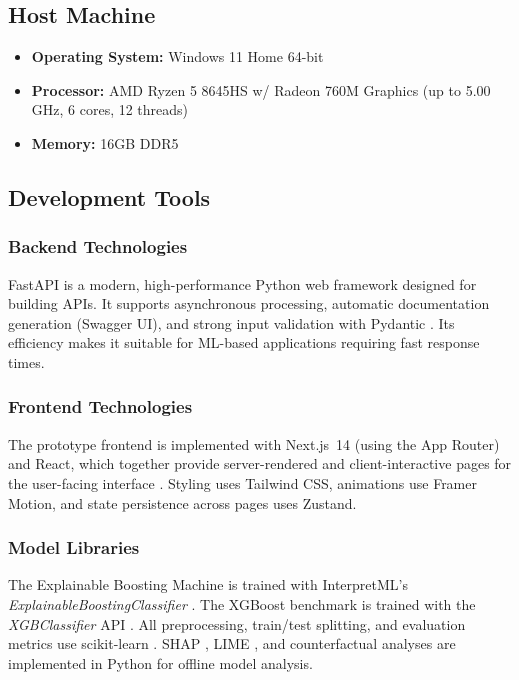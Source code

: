 \documentclass{icsthesis}
\begin{document}
\begin{mainmatter}
			\subsection{Host Machine}
				\begin{itemize}
				    \item \textbf{Operating System:} Windows 11 Home 64-bit
				    \item \textbf{Processor:} AMD Ryzen 5 8645HS w/ Radeon 760M Graphics (up to 5.00 GHz, 6 cores, 12 threads)
				    \item \textbf{Memory:} 16GB DDR5
				\end{itemize}

			\subsection{Development Tools}
				\subsubsection{Backend Technologies}
					FastAPI is a modern, high-performance Python web framework designed for building APIs. It supports asynchronous processing, automatic documentation generation (Swagger UI), and strong input validation with Pydantic \cite{ref21}. Its efficiency makes it suitable for ML-based applications requiring fast response times.

				\subsubsection{Frontend Technologies}
					The prototype frontend is implemented with Next.js~14 (using the App Router) and React, which together provide server-rendered and client-interactive pages for the user-facing interface \cite{ref22}. Styling uses Tailwind CSS, animations use Framer Motion, and state persistence across pages uses Zustand.

				\subsubsection{Model Libraries}
					The Explainable Boosting Machine is trained with InterpretML's \emph{ExplainableBoostingClassifier} \cite{ref15}. The XGBoost benchmark is trained with the \emph{XGBClassifier} API \cite{ref16}. All preprocessing, train/test splitting, and evaluation metrics use scikit-learn \cite{ref74}. SHAP \cite{ref18}, LIME \cite{ref19}, and counterfactual analyses \cite{ref20} are implemented in Python for offline model analysis.


\end{mainmatter}
\end{document}
